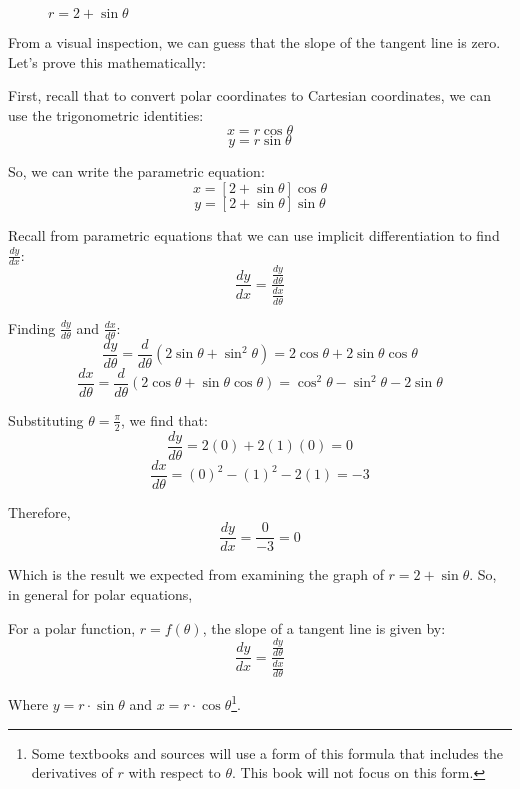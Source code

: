 \begin{figure}[htbp]
\centering
    \caption{$r = 2 + \sin{\theta}$}
    \label{fig:cardioid}
    \end{figure}

From a visual inspection, we can guess that the slope of the tangent line is 
zero. Let's prove this mathematically:

First, recall that to convert polar coordinates to Cartesian coordinates, we 
can use the trigonometric identities:
$$x = r\cos{\theta}$$
$$y = r\sin{\theta}$$

So, we can write the parametric equation:
$$x = \left[2 + \sin{\theta} \right]\cos{\theta}$$
$$y = \left[ 2 + \sin{\theta} \right]\sin{\theta}$$

Recall from parametric equations that we can use implicit differentiation to 
find $\frac{dy}{dx}$:
$$\frac{dy}{dx} = \frac{\frac{dy}{d\theta}}{\frac{dx}{d\theta}}$$

Finding $\frac{dy}{d\theta}$ and $\frac{dx}{d\theta}$:
$$\frac{dy}{d\theta} = \frac{d}{d\theta} \left( 2\sin{\theta} + \sin^2{\theta} 
\right) = 2\cos{\theta} + 2\sin{\theta}\cos{\theta}$$
$$\frac{dx}{d\theta} = \frac{d}{d\theta} \left( 2\cos{\theta} + \sin{\theta}
\cos{\theta} \right) = \cos^2{\theta} - \sin^2{\theta} - 2\sin{\theta}$$

Substituting $\theta = \frac{\pi}{2}$, we find that:
$$\frac{dy}{d\theta} = 2(0) + 2(1)(0) = 0$$
$$\frac{dx}{d\theta} = (0)^2 - (1)^2 - 2(1) = -3$$

Therefore,
$$\frac{dy}{dx} = \frac{0}{-3} = 0$$

Which is the result we expected from examining the graph of $r = 2 + \sin{
\theta}$. 
So, in general for polar equations, 
\begin{mdframed}[style=important, frametitle={Tangent to a Polar Function}]
For a polar function, $r = f(\theta)$, the slope of a tangent line is given by:
$$\frac{dy}{dx} = \frac{\frac{dy}{d\theta}}{\frac{dx}{d\theta}}$$

Where $y = r \cdot \sin{\theta}$ and $x = r \cdot \cos{\theta}$\footnote{Some textbooks and sources will use a form of this formula that includes the derivatives of $r$ with respect to $\theta$. This book will not focus on this form. }.
\end{mdframed}

